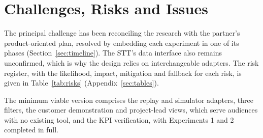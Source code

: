 \section{Challenges, Risks and Issues}
\label{sec:risks}

The principal challenge has been reconciling the research with the partner's product-oriented plan, resolved by embedding each experiment in one of its phases (Section~\ref{sec:timeline}).
The STT's data interface also remains unconfirmed, which is why the design relies on interchangeable adapters.
The risk register, with the likelihood, impact, mitigation and fallback for each risk, is given in Table~\ref{tab:risks} (Appendix~\ref{sec:tables}).

The minimum viable version comprises the replay and simulator adapters, three filters, the customer demonstration and project-lead views, which serve audiences with no existing tool, and the KPI verification, with Experiments 1 and 2 completed in full.
